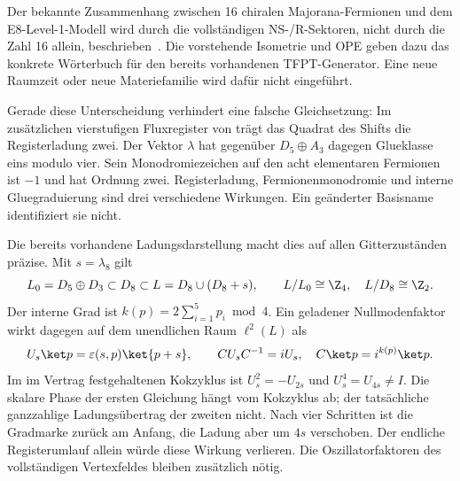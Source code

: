 Der bekannte Zusammenhang zwischen 16 chiralen Majorana-Fermionen und dem E8-Level-1-Modell wird durch die vollständigen NS-/R-Sektoren, nicht durch die Zahl 16 allein, beschrieben~\cite[Abschnitt 5.1, Gleichungen (5.3)--(5.6)]{boylesmith}. Die vorstehende Isometrie und OPE geben dazu das konkrete Wörterbuch für den bereits vorhandenen TFPT-Generator. Eine neue Raumzeit oder neue Materiefamilie wird dafür nicht eingeführt.


Gerade diese Unterscheidung verhindert eine falsche Gleichsetzung: Im zusätzlichen vierstufigen Fluxregister von  trägt das Quadrat des Shifts die Registerladung zwei. Der Vektor $\lambda$ hat gegenüber $D_5\oplus A_3$ dagegen Glueklasse eins modulo vier. Sein Monodromiezeichen auf den acht elementaren Fermionen ist $-1$ und hat Ordnung zwei. Registerladung, Fermionenmonodromie und interne Gluegraduierung sind drei verschiedene Wirkungen. Ein geänderter Basisname identifiziert sie nicht.

Die bereits vorhandene Ladungsdarstellung macht dies auf allen Gitterzuständen präzise. Mit $s=\lambda_8$ gilt
\[
 L_0=D_5\oplus D_3\subset D_8\subset L=D_8\cup(D_8+s),
 \qquad L/L_0\cong\Z_4,\quad L/D_8\cong\Z_2.
\]
Der interne Grad ist $k(p)=2\sum_{i=1}^5p_i\bmod4$. Ein geladener Nullmodenfaktor wirkt dagegen auf dem unendlichen Raum $\ell^2(L)$ als
\[
 U_s\ket p=\varepsilon(s,p)\ket{p+s},\qquad
 CU_sC^{-1}=iU_s,\quad C\ket p=i^{k(p)}\ket p.
\]
Im im Vertrag festgehaltenen Kokzyklus ist $U_s^2=-U_{2s}$ und $U_s^4=U_{4s}\ne I$. Die skalare Phase der ersten Gleichung hängt vom Kokzyklus ab; der tatsächliche ganzzahlige Ladungsübertrag der zweiten nicht. Nach vier Schritten ist die Gradmarke zurück am Anfang, die Ladung aber um $4s$ verschoben. Der endliche Registerumlauf allein würde diese Wirkung verlieren. Die Oszillatorfaktoren des vollständigen Vertexfeldes bleiben zusätzlich nötig.


